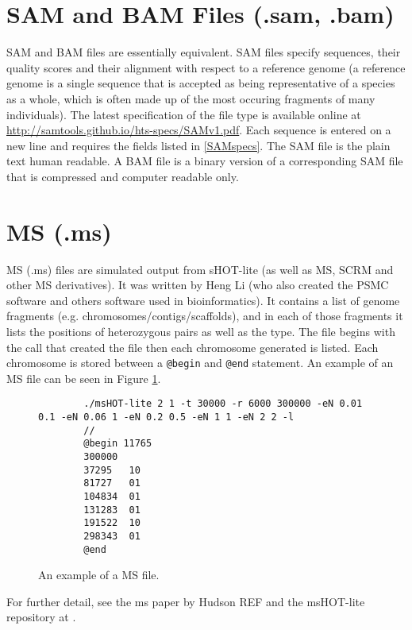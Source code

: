 \documentclass[a4]{article}
\begin{document}
\section{SAM and BAM Files (.sam, .bam)}
	SAM and BAM files are essentially equivalent. SAM files specify sequences, their quality scores and their alignment with respect to a reference genome (a reference genome is a single sequence that is accepted as being representative of a species as a whole, which is often made up of the most occuring fragments of many individuals). The latest specification of the file type is available online at \url{http://samtools.github.io/hts-specs/SAMv1.pdf}. Each sequence is entered on a new line and requires the fields listed in \ref{SAMspecs}. The SAM file is the plain text human readable. A BAM file is a binary version of a corresponding SAM file that is compressed and computer readable only. 
	

\section{MS (.ms)}
	MS (.ms) files are simulated output from sHOT-lite (as well as MS, SCRM and other MS derivatives). It was written by Heng Li (who also created the PSMC software and others software used in bioinformatics). It contains a list of genome fragments (e.g. chromosomes/contigs/scaffolds), and in each of those fragments it lists the positions of heterozygous pairs as well as the type. The file begins with the call that created the file then each chromosome generated is listed. Each chromosome is stored between a \verb|@begin| and \verb|@end| statement. An example of an MS file can be seen in Figure \ref{msFile}.
	\begin{figure}[h]
		\begin{lstlisting}
		./msHOT-lite 2 1 -t 30000 -r 6000 300000 -eN 0.01 0.1 -eN 0.06 1 -eN 0.2 0.5 -eN 1 1 -eN 2 2 -l 
		//
		@begin 11765
		300000
		37295	10
		81727	01
		104834	01
		131283	01
		191522	10
		298343	01
		@end
		\end{lstlisting}
		\caption{An example of a MS file.}
		\label{msFile}
	\end{figure}
For further detail, see the ms paper by Hudson REF and the msHOT-lite repository at \url{}.
\end{document}
